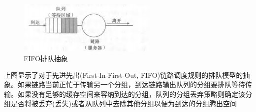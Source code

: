 \begin{figure}[!htbp]
    \centering
    \includegraphics[width=0.6\textwidth]{image/chapter04/FIFO排队抽象.png}
    \caption{FIFO排队抽象}
\end{figure}

    上图显示了对于先进先出(First-In-First-Out, FIFO)链路调度规则的排队模型的抽象。如果链路当前正忙于传输另一个分组，到达链路输出队列的分组要排队等待传输。如果没有足够的缓存空间来容纳到达的分组，队列的分组丢弃策略则确定该分组是否将被丢弃(丢失)或者从队列中去除其他分组以便为到达的分组腾出空间

    